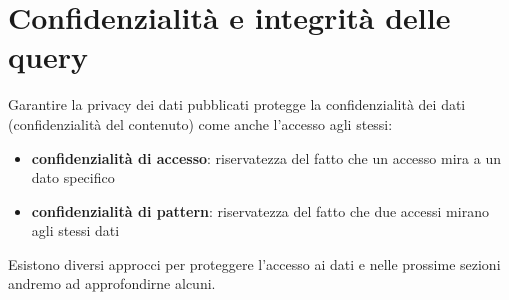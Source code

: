 \section{Confidenzialità e integrità delle query}
Garantire la privacy dei dati pubblicati protegge la confidenzialità dei dati (confidenzialità del contenuto) come anche l'accesso agli stessi:
\begin{itemize}
    \item \textbf{confidenzialità di accesso}: riservatezza del fatto che un accesso mira a un dato specifico
    \item \textbf{confidenzialità di pattern}: riservatezza del fatto che due accessi mirano agli stessi dati
\end{itemize}
Esistono diversi approcci per proteggere l'accesso ai dati e nelle prossime sezioni andremo ad approfondirne alcuni.
